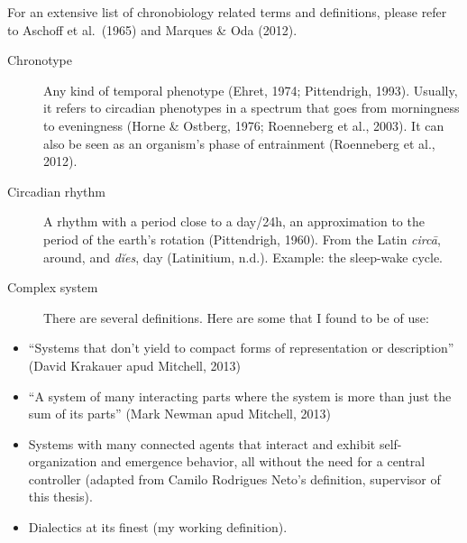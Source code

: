\documentclass[
  12pt,
  a4paper,
  oneside]{tesesusp}
\providecommand{\tightlist}{%
  \setlength{\itemsep}{0pt}\setlength{\parskip}{0pt}}\usepackage{longtable,booktabs,array}
\begin{document}
\begin{termos}
For an extensive list of chronobiology related terms and definitions,
please refer to Aschoff et al.~(1965) and Marques \& Oda (2012).

\begin{description}
\item[Chronotype]
\hspace{20cm}

Any kind of temporal phenotype (Ehret, 1974; Pittendrigh, 1993).
Usually, it refers to circadian phenotypes in a spectrum that goes from
morningness to eveningness (Horne \& Ostberg, 1976; Roenneberg et al.,
2003). It can also be seen as an organism's phase of entrainment
(Roenneberg et al., 2012).
\end{description}

\begin{description}
\item[Circadian rhythm]
\hspace{20cm}

A rhythm with a period close to a day/24h, an approximation to the
period of the earth's rotation (Pittendrigh, 1960). From the Latin
\emph{circā}, around, and \emph{dĭes}, day (Latinitium, n.d.). Example:
the sleep-wake cycle.
\end{description}

\begin{description}
\item[Complex system]
\hspace{20cm}

There are several definitions. Here are some that I found to be of use:
\end{description}

\begin{itemize}
\tightlist
\item
  ``Systems that don't yield to compact forms of representation or
  description'' (David Krakauer apud Mitchell, 2013)
\item
  ``A system of many interacting parts where the system is more than
  just the sum of its parts'' (Mark Newman apud Mitchell, 2013)
\item
  Systems with many connected agents that interact and exhibit
  self-organization and emergence behavior, all without the need for a
  central controller (adapted from Camilo Rodrigues Neto's definition,
  supervisor of this thesis).
\item
  Dialectics at its finest (my working definition).
\end{itemize}


\end{termos}
\end{document}
